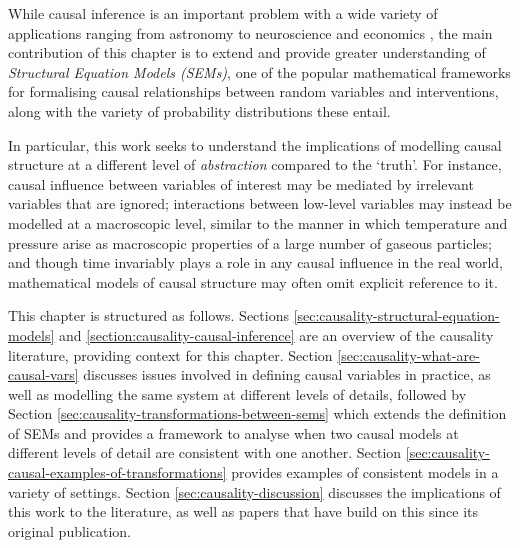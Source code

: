 While causal inference is an important problem with a wide variety of applications ranging from astronomy to neuroscience and economics \citep{scholkopf2016modeling, ding200617, hicks1980causality}, the main contribution of this chapter is to extend and provide greater understanding of \emph{Structural Equation Models (SEMs)}, one of the popular mathematical frameworks for formalising causal relationships between random variables and interventions, along with the variety of probability distributions these entail.
 
In particular, this work seeks to understand the implications of modelling causal structure at a different level of \emph{abstraction} compared to the `truth'. For instance, causal influence between variables of interest may be mediated by irrelevant variables that are ignored; interactions between low-level variables may instead be modelled at a macroscopic level, similar to the manner in which temperature and pressure arise as macroscopic properties of a large number of gaseous particles; and though time invariably plays a role in any causal influence in the real world, mathematical models of causal structure may often omit explicit reference to it.

This chapter is structured as follows.
Sections \ref{sec:causality-structural-equation-models} and \ref{section:causality-causal-inference} are an overview of the causality literature, providing context for this chapter.
Section \ref{sec:causality-what-are-causal-vars} discusses issues involved in defining causal variables in practice, as well as modelling the same system at different levels of details,
followed by Section \ref{sec:causality-transformations-between-sems} which extends the definition of SEMs and provides a framework to analyse when two causal models at different levels of detail are consistent with one another.
Section \ref{sec:causality-causal-examples-of-transformations} provides examples of consistent models in a variety of settings.
Section \ref{sec:causality-discussion} discusses the implications of this work to the literature, as well as papers that have build on this since its original publication. 


